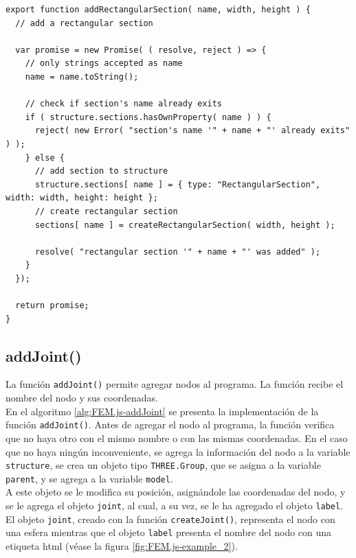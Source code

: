 \begin{lstlisting}[language={},caption=Función \texttt{addRectangularSection()} implementada en el archivo \texttt{FEM.js}.,label=alg:FEM.js-addRectangularSection, frame=single]
export function addRectangularSection( name, width, height ) {
  // add a rectangular section

  var promise = new Promise( ( resolve, reject ) => {
    // only strings accepted as name
    name = name.toString();

    // check if section's name already exits
    if ( structure.sections.hasOwnProperty( name ) ) {
      reject( new Error( "section's name '" + name + "' already exits" ) );
    } else {
      // add section to structure
      structure.sections[ name ] = { type: "RectangularSection", width: width, height: height };
      // create rectangular section
      sections[ name ] = createRectangularSection( width, height );
    
      resolve( "rectangular section '" + name + "' was added" );
    }
  });

  return promise;
}
\end{lstlisting}

\subsection{addJoint()}

La función \verb|addJoint()| permite agregar nodos al programa. La función recibe el nombre del nodo y sus coordenadas.\\

En el algoritmo \ref{alg:FEM.js-addJoint} se presenta la implementación de la función \verb|addJoint()|. Antes de agregar el nodo al programa, la función verifica que no haya otro con el mismo nombre o con las mismas coordenadas. En el caso que no haya ningún inconveniente, se agrega la información del nodo a la variable \verb|structure|, se crea un objeto tipo \verb|THREE.Group|, que se asigna a la variable \verb|parent|, y se agrega a la variable \verb|model|.\\

A este objeto se le modifica su posición, asignándole las coordenadas del nodo, y se le agrega el objeto  \verb|joint|, al cual, a su vez, se le ha agregado el objeto \verb|label|. El objeto \verb|joint|, creado con la función \verb|createJoint()|, representa el nodo con una esfera mientras que el objeto \verb|label| presenta el nombre del nodo con una etiqueta html (véase la figura \ref{fig:FEM.js-example_2}).\\

